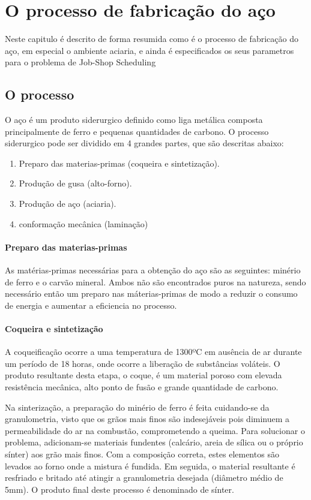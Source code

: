 \chapter{O processo de fabricação do aço}\label{fab_aco}

Neste capitulo é descrito de forma resumida como é o processo de fabricação do aço, em especial o ambiente aciaria, e ainda é especificados os seus parametros para o problema de Job-Shop Scheduling

\section{O processo}
\cite{UFPR} O aço é um produto siderurgico definido como liga metálica composta principalmente de ferro e pequenas quantidades de carbono. O processo siderurgico pode ser dividido em 4 grandes partes, que são descritas abaixo:
\begin {enumerate}
	\item Preparo das materias-primas (coqueira e sintetização).
	\item Produção de gusa (alto-forno).
	\item Produção de aço (aciaria).
	\item conformação mecânica (laminação)
\end{enumerate}

\subsubsection{Preparo das materias-primas}
As matérias-primas necessárias para a obtenção do aço são as seguintes: minério de ferro e o carvão mineral. Ambos não são encontrados puros na natureza, sendo necessário então um preparo nas máterias-primas de modo a reduzir o consumo de energia e aumentar a eficiencia no processo.

\subsubsection{Coqueira e sintetização}
A coqueificação ocorre a uma temperatura de 1300ºC em ausência de ar durante um período de 18 horas, onde ocorre a liberação de substâncias voláteis. O produto resultante desta etapa, o coque, é um material poroso com elevada resistência mecânica, alto ponto de fusão e grande quantidade de carbono.

Na sinterização, a preparação do minério de ferro é feita cuidando-se da granulometria, visto que os grãos mais finos são indesejáveis pois diminuem a permeabilidade do ar na combustão, comprometendo a queima. Para solucionar o problema, adicionam-se materiais fundentes (calcário, areia de sílica ou o próprio sínter) aos grão mais finos.
Com a composição correta, estes elementos são levados ao forno onde a mistura é fundida. Em seguida, o material resultante é resfriado e britado até atingir a granulometria desejada (diâmetro médio de 5mm).
O produto final deste processo é denominado de sínter.

